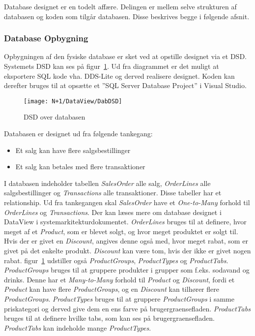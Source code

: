 Database designet er en todelt affære. Delingen er mellem selve strukturen af databasen og koden som tilgår databasen.
Disse beskrives begge i følgende afsnit.

\subsubsection{Database Opbygning}
Opbygningen af den fysiske database er sket ved at opstille designet via et \gls{DSD}. Systemets \gls{DSD}  kan ses på figur~\ref{fig:DSD}. Ud fra diagrammet er det muligt at eksportere SQL kode vha. \gls{DDS-Lite} og derved realisere designet. Koden kan derefter bruges til at opsætte et ''SQL Server Database Project'' i Visual Studio. 

\begin{figure}[H]
    \centering
    \texttt{[image: N+1/DataView/DabDSD]}
    \caption{\gls{DSD} over databasen}
    \label{fig:DSD}
\end{figure}

Databasen er designet ud fra følgende tankegang:
\begin{itemize}
	\item Et salg kan have flere salgsbestillinger
	\item Et salg kan betales med flere transaktioner
\end{itemize}
I databasen indeholder tabellen \textit{SalesOrder} alle salg, \textit{OrderLines} alle salgsbestillinger og \textit{Transactions} alle transaktioner. Disse tabeller har et relationship. Ud fra tankegangen skal \textit{SalesOrder} have et \textit{One-to-Many} forhold til \textit{OrderLines} og \textit{Transactions}. Der kan læses mere om database designet i DataView i systemarkitekturdokumentet.
\newline\newline
\textit{OrderLines} bruges til at definere, hvor meget af et \textit{Product}, som er blevet solgt, og hvor meget produktet er solgt til. Hvis der er givet en \textit{Discount}, angives denne også med, hvor meget rabat, som er givet på det enkelte produkt. \textit{Discount} kan være tom, hvis der ikke er givet nogen rabat.
\newline\newline
figur~\ref{fig:DSD} udstiller også \textit{ProductGroups}, \textit{ProductTypes} og \textit{ProductTabs}. \textit{ProductGroups} bruges til at gruppere produkter i grupper som f.eks. sodavand og drinks. Denne har et \textit{Many-to-Many} forhold til \textit{Product} og \textit{Discount}, fordi et \textit{Product} kan have flere \textit{ProductGroups}, og en \textit{Discount} kan tilhører flere \textit{ProductGroups}. \textit{ProductTypes} bruges til at gruppere \textit{ProductGroups} i samme priskategori og derved give dem en ens farve på \gls{brugergraenseflade}n. \textit{ProductTabs} bruges til at definere hvilke tabs, som kan ses på \gls{brugergraenseflade}n. \textit{ProductTabs} kan indeholde mange \textit{ProductTypes}.

